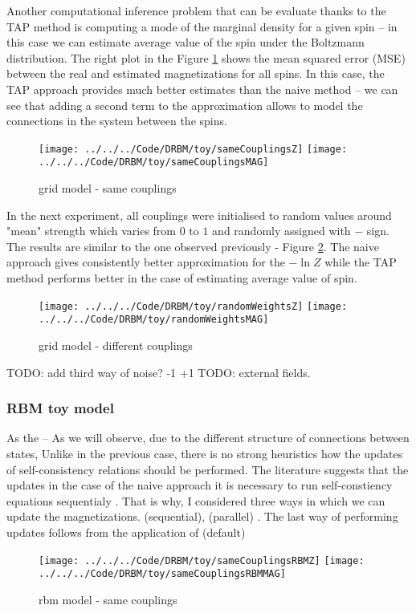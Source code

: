 \documentclass[../report/report.tex]{subfiles}
\begin{document}
Another computational inference problem that can be evaluate thanks to the TAP method is computing a mode of the marginal density for a given spin -- in this case we can estimate average value of the spin under the Boltzmann distribution. The right plot in the Figure \ref{fig:gridModel} shows the mean squared error (MSE) between the real and estimated magnetizations for all spins. In this case, the TAP approach provides much better estimates than the naive method -- we can see that adding a second term to the approximation allows to model the connections in the system between the spins. 

\begin{figure}[!htb]
%
 \texttt{[image: ../../../Code/DRBM/toy/sameCouplingsZ]}
\endminipage 
{}  
 \texttt{[image: ../../../Code/DRBM/toy/sameCouplingsMAG]}
\endminipage\hfill
\label{fig:gridModel}
  \caption[1]{grid model - same couplings}
\end{figure}

In the next experiment, all couplings were initialised to random values around "mean" strength which varies from $0$ to $1$ and randomly assigned with $-$ sign. The results are similar to the one observed previously - Figure \ref{fig:gridModelCoup}. The naive approach gives consistently better approximation for the $-\ln Z$ while the TAP method performs better in the case of estimating average value of spin. 

\begin{figure}[!htb]
%
 \texttt{[image: ../../../Code/DRBM/toy/randomWeightsZ]}
\endminipage 
{}  
 \texttt{[image: ../../../Code/DRBM/toy/randomWeightsMAG]}
\endminipage\hfill
\label{fig:gridModelCoup}
  \caption[1]{grid model - different couplings}
\end{figure}
TODO: add third way of noise?  -1 +1
TODO: external fields.

\subsubsection{RBM toy model}
As the -- As we will observe, due to the different structure of connections between states, 
Unlike in the previous case, there is no strong heuristics how the updates of self-consistency relations should be performed. The literature suggests that the updates in the case of the naive approach it is necessary to run self-constiency equations sequentialy \cite{welling2002new}. That is why, I considered three ways in which we can update the magnetizations. (sequential), (parallel) . The last way of performing updates follows from the application of \cite{bolthausen2014iterative} (default)
\begin{figure}[!htb]
%
 \texttt{[image: ../../../Code/DRBM/toy/sameCouplingsRBMZ]}
\endminipage 
{}  
 \texttt{[image: ../../../Code/DRBM/toy/sameCouplingsRBMMAG]}
\endminipage\hfill
\label{fig:rbmSame}
  \caption[1]{rbm model - same couplings}
\end{figure}
\end{document}
